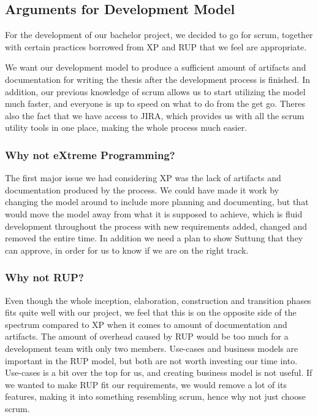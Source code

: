 \subsection{Arguments for Development Model}
For the development of our bachelor project, we decided to go for  scrum, together with certain practices borrowed from XP and RUP that we feel are appropriate.

We want our development model to produce a sufficient amount of artifacts and documentation for writing the thesis after the development process is finished.
In addition, our previous knowledge of scrum allows us to start utilizing the model much faster, and everyone is up to speed on what to do from the get go.
Theres also the fact that we have access to JIRA, which provides us with all the scrum utility tools in one place, making the whole process much easier.

\subsubsection{Why not eXtreme Programming?}
The first major issue we had considering XP was the lack of artifacts and documentation produced by the process.
We could have made it work by changing the model around to include more planning and documenting, 
but that would move the model away from what it is supposed to achieve, 
which is fluid development throughout the process with new requirements added, changed and removed the entire time.
In addition we need a plan to show Suttung that they can approve, in order for us to know if we are on the right track.

\subsubsection{Why not RUP?}
Even though the whole inception, elaboration, construction and transition phases fits quite well with our project, 
we feel that this is on the opposite side of the spectrum compared to XP when it comes to amount of documentation and artifacts. 
The amount of overhead caused by RUP would be too much for a development team with only two members.
Use-cases and business models are important in the RUP model, but both are not worth investing our time into.
Use-cases is a bit over the top for us, and creating business model is not useful.
If we wanted to make RUP fit our requirements, we would remove a lot of its features, making it into something resembling scrum, hence why not just choose scrum.

